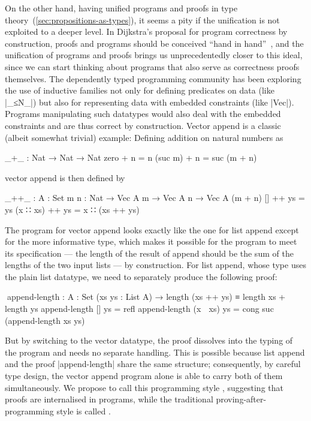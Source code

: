 On the other hand, having unified programs and proofs in type theory~(\autoref{sec:propositions-as-types}), it seems a pity if the unification is not exploited to a deeper level.
In Dijkstra's proposal for program correctness by construction, proofs and programs should be conceived ``hand in hand''~\citep{Dijkstra-discipline}, and the unification of programs and proofs brings us unprecedentedly closer to this ideal, since we can start thinking about programs that also serve as correctness proofs themselves.
The dependently typed programming community has been exploring the use of inductive families not only for defining predicates on data (like |_≤N_|) but also for representing data with embedded constraints (like |Vec|).
Programs manipulating such datatypes would also deal with the embedded constraints and are thus correct by construction.
Vector append is a classic (albeit somewhat trivial) example:
Defining addition on natural numbers as
\begin{code}
_+_ : Nat → Nat → Nat
zero     + n = n
(suc m)  + n = suc (m + n)
\end{code}
vector append is then defined by
\begin{code}
_++_ : {A : Set} {m n : Nat} → Vec A m → Vec A n → Vec A (m + n)
[]        ++ ys = ys
(x ∷ xs)  ++ ys = x ∷ (xs ++ ys)
\end{code}
The program for vector append looks exactly like the one for list append except for the more informative type, which makes it possible for the program to meet its specification --- the length of the result of append should be the sum of the lengths of the two input lists --- by construction.
For list append, whose type uses the plain list datatype, we need to separately produce the following proof:
\begin{code}
^^^append-length :
  {A : Set} (xs ys : List A) → length (xs ++ ys) ≡ length xs + length ys
append-length []        ys = refl
append-length (x ∷ xs)  ys = cong suc (append-length xs ys)
\end{code}
But by switching to the vector datatype, the proof dissolves into the typing of the program and needs no separate handling.
This is possible because list append and the proof |append-length| share the same structure; consequently, by careful type design, the vector append program alone is able to carry both of them simultaneously.
We propose to call this programming style , suggesting that proofs are internalised in programs, while the traditional proving-after-programming style is called .
